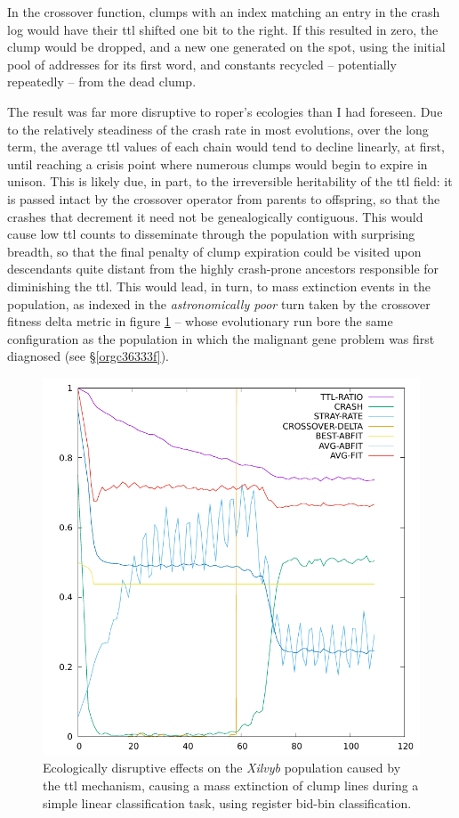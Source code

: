 \documentclass[12pt,glossary]{dalthesis}
\begin{document}
In the crossover function, clumps with an index matching an entry in the crash log
would have their \gls{ttl} shifted one bit to the right. If this resulted in zero, the
clump would be dropped, and a new one generated on the spot, using the initial pool
of addresses for its first word, and constants recycled -- potentially repeatedly -- from
the dead clump. 

The result was far more disruptive to \gls{roper}'s ecologies than I had foreseen. 
Due to the relatively steadiness of the crash rate in most evolutions, over the
long term, the average \gls{ttl} values of each chain would tend to decline 
linearly, at first, until reaching a crisis point where numerous clumps would begin
to expire in unison. 
This is likely due, in part, to the irreversible heritability
of the \gls{ttl} field: it is passed intact by the crossover operator from parents to 
offspring, so that the crashes that decrement it need not be genealogically
contiguous. This would cause low \gls{ttl} counts to disseminate through the
population with surprising breadth, so that the final penalty of clump expiration
could be visited upon descendants quite distant from the highly crash-prone
ancestors responsible for diminishing the \gls{ttl}. 
This would lead, in turn, to mass extinction events in the population, as indexed in
the \emph{astronomically poor} turn taken by the crossover fitness delta metric in 
figure \ref{fig:org115e2e4} -- whose evolutionary run bore the same configuration as the population
in which the malignant gene problem was first diagnosed (see \S \ref{orgc36333f}).  

\begin{figure}[htbp]
\centering
\includegraphics[width=.9\linewidth]{../images/plots/xilvyb.pdf}
\caption{\label{fig:org115e2e4}
Ecologically disruptive effects on the \emph{Xilvyb} population caused by the \gls{ttl} mechanism, causing a mass extinction of clump lines during a simple linear classification task, using register bid-bin classification.}
\end{figure}
\end{document}
